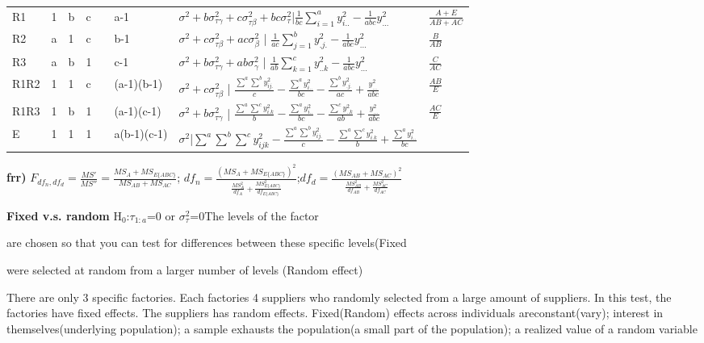 \documentclass[
  10pt,
  twocolumn]{article}
\begin{document}
\begin{tabular}{ l|l|l|l|l|l|l|l }\hline
R1  &1&b&c&&a-1&$\sigma^2+b\sigma^2_{\tau\gamma}+c\sigma^2_{\tau\beta}+bc\sigma^2_{\tau}$|$\frac1{bc}\sum_{i=1}^ay_{i..}^2-\frac{1}{abc}y_{...}^2$&$\frac{A+E}{AB+AC}$\\
R2  &a&1&c&&b-1&$\sigma^2+c\sigma^2_{\tau\beta}+ac\sigma^2_{\beta}$ | $\frac1{ac}\sum_{j=1}^by_{.j.}^2-\frac{1}{abc}y_{...}^2$&$\frac{B}{AB}$\\
R3  &a&b&1&&c-1&$\sigma^2+b\sigma^2_{\tau\gamma}+ab\sigma^2_{\gamma}$ | $\frac1{ab}\sum_{k=1}^cy_{..k}^2-\frac{1}{abc}y_{...}^2$&$\frac{C}{AC}$\\
R1R2 &1&1&c&&(a-1)(b-1)&$\sigma^2+c\sigma^2_{\tau\beta}$ | $\frac{\sum^a\sum^by_{ij.}^2}c-\frac{\sum^ay_{i..}^2}{bc}-\frac{\sum^by_{.j.}^2}{ac}+\frac{y_{...}^2}{abc}$&$\frac{AB}{E}$\\
R1R3 &1&b&1&&(a-1)(c-1)&$\sigma^2+b\sigma^2_{\tau\gamma}$ | $\frac{\sum^a\sum^cy_{i.k}^2}b-\frac{\sum^ay_{i..}^2}{bc}-\frac{\sum^cy_{..k}^2}{ab}+\frac{y_{...}^2}{abc}$&$\frac{AC}{E}$\\
E&1&1&1&&a(b-1)(c-1)& $\sigma^2$|$\sum^a\sum^b\sum^cy_{ijk}^2-\frac{\sum^a\sum^by_{ij.}^2}c-\frac{\sum^a\sum^cy_{i.k}^2}b+\frac{\sum^ay_{i..}^2}{bc}$ &\\\hline
\end{tabular}

\textbf{frr)}
\(F_{df_n,df_d}=\frac{MS'}{MS''}=\frac{MS_{A}+MS_{E\{ABC\}}}{MS_{AB}+MS_{AC}}\);
\(df_n=\frac{(MS_{A}+MS_{E\{ABC\}})^2}{\frac{MS_{A}^2}{df_{A}}+\frac{MS_{E\{ABC\}}^2}{df_{E\{ABC\}}}}\);\(df_d=\frac{(MS_{AB}+MS_{AC})^2}{\frac{MS_{AB}^2}{df_{AB}}+\frac{MS_{AC}^2}{df_{AC}}}\)

\textbf{ Fixed v.s. random} H\(_0\):\(\tau_{1:a}\)=0 or
\(\sigma^2_\tau\)=0The levels of the factor

are chosen so that you can test for differences between these specific
levels(Fixed

were selected at random from a larger number of levels (Random effect)

There are only 3 specific factories. Each factories 4 suppliers who
randomly selected from a large amount of suppliers. In this test, the
factories have fixed effects. The suppliers has random effects.
Fixed(Random) effects across individuals areconstant(vary); interest in
themselves(underlying population); a sample exhausts the population(a
small part of the population); a realized value of a random variable

\hrulefill
\end{document}
